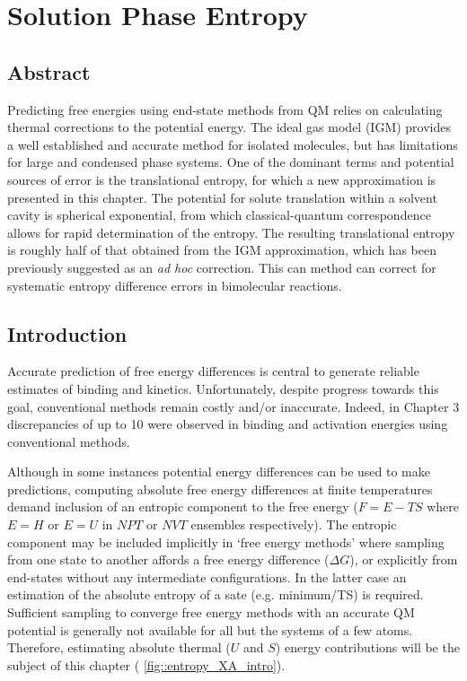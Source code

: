 \documentclass[../main.tex]{subfiles}
\begin{document}
\setcounter{footnote}{0} 



\chapter{Solution Phase Entropy}

\section{Abstract}

Predicting free energies using end-state methods from QM relies on calculating thermal corrections to the potential energy. The ideal gas model (IGM) provides a well established and accurate method for isolated molecules, but has limitations for large and condensed phase systems. One of the dominant terms and potential sources of error is the translational entropy, for which a new approximation is presented in this chapter. The potential for solute translation within a solvent cavity is spherical exponential, from which classical-quantum correspondence allows for rapid determination of the entropy. The resulting translational entropy is roughly half of that obtained from the IGM approximation, which has been previously suggested as an \emph{ad hoc} correction. This can method can correct for systematic entropy difference errors in bimolecular reactions.


\section{Introduction}

Accurate prediction of free energy differences is central to generate reliable estimates of binding and kinetics. Unfortunately, despite progress towards this goal, conventional methods remain costly and/or inaccurate. Indeed, in Chapter 3 discrepancies of up to 10 \kcalx were observed in binding and activation energies using conventional methods.

Although in some instances potential energy differences can be used to make predictions, computing absolute free energy differences at finite temperatures demand inclusion of an entropic component to the free energy ($F = E - TS$ where $E= H$ or $E=U$ in $NPT$ or $NVT$ ensembles respectively). The entropic component may be included implicitly in `free energy methods' where sampling from one state to another affords a free energy difference ($\Delta G$),\cite{Boresch2003, Mobley2017, Armacost2020, Zhou2009} or explicitly from end-states without any intermediate configurations. In the latter case an estimation of the absolute entropy of a sate (e.g. minimum/TS) is required.\cite{Jensen1999} Sufficient sampling to converge free energy methods with an accurate QM potential is generally not available for all but the systems of a few atoms.\cite{Iftimie2005} Therefore, estimating absolute thermal ($U$ and $S$) energy contributions will be the subject of this chapter (\figurename{ \ref{fig::entropy_XA_intro}}).
\end{document}
